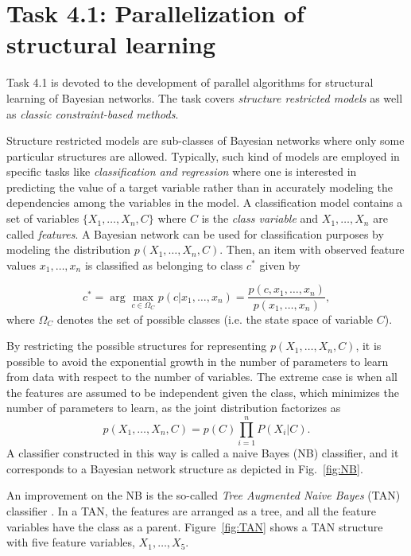 

\section{Task 4.1: Parallelization of structural learning}\label{sec:parallel}

Task 4.1 is devoted to the development of parallel algorithms for structural learning of Bayesian networks.
The task covers \emph{structure restricted models} as well as \emph{classic constraint-based methods}.

Structure restricted models are sub-classes of Bayesian networks where only some particular structures
are allowed. Typically, such kind of models are employed in specific tasks like \emph{classification and regression}
where one is interested in predicting the value of a target variable rather than in accurately modeling the dependencies
among the variables in the model. A classification model contains a set of variables $\{X_1,\ldots,X_n,C\}$
where $C$ is the \emph{class variable} and $X_1,\ldots,X_n$ are called \emph{features}. A Bayesian network can be used
for classification purposes by modeling the distribution $p(X_1,\ldots,X_n,C)$. Then, an item with observed
feature values $x_1,\ldots,x_n$ is classified as belonging to class $c^*$ given by

\begin{equation}
\label{eq:class}
c^* = \arg\max_{c\in\Omega_C} p(c|x_1,\ldots,x_n) = \frac{p(c,x_1,\ldots,x_n)}{p(x_1,\ldots,x_n)} ,
\end{equation}
where $\Omega_C$ denotes the set of possible classes (i.e. the state space of variable $C$).

By restricting the possible structures for representing $p(X_1,\ldots,X_n,C)$, it is possible to avoid the exponential
growth in the number of parameters to learn from data with respect to the number of variables. The extreme case
is when all the features are assumed to be independent given the class, which minimizes the number of parameters
to learn, as the joint distribution factorizes as 
\[
p(X_1,\ldots,X_n,C) = p(C) \prod_{i=1}^nP(X_i|C) .
\]
A classifier constructed in this way is called a naive Bayes (NB) classifier, and it corresponds to a Bayesian network
structure as depicted in Fig.~\ref{fig:NB}.

An improvement on the NB is the so-called \emph{Tree Augmented Naive Bayes} (TAN) classifier \cite{Fri97}. In a TAN, the
features are arranged as a tree, and all the feature variables have the class as a parent. Figure~\ref{fig:TAN}
shows a TAN structure with five feature variables, $X_1,\ldots,X_5$.

